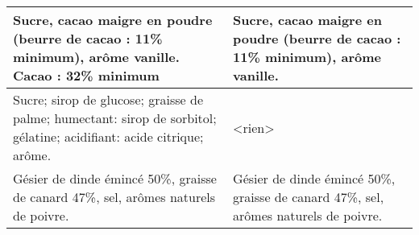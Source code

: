 \begin{longtable}{p{7cm}p{7cm}}
                                                                                                                                                                                                     Sucre, cacao maigre en poudre (beurre de cacao : 11\% minimum), arôme vanille. \newline Cacao : 32\% minimum &                                                                                                                                                                                                                                                                                                                                                                                          Sucre, cacao maigre en poudre (beurre de cacao : 11\% minimum), arôme vanille.  \\ \hline
                                                                                                                                                                                  Sucre; sirop de glucose; graisse de palme; humectant: sirop de sorbitol; gélatine; acidifiant: acide citrique; arôme. &                                                                                                                                                                                                                                                                                                                                                                                                                                                                  <rien> \\ \hline
                                                                                                                                                                                                                     Gésier de dinde émincé 50\%, graisse de canard 47\%, sel, arômes naturels de poivre. &                                                                                                                                                                                                                                                                                                                                                                                 Gésier de dinde émincé 50\%,  graisse de canard 47\%, sel, arômes naturels de poivre.  \newline   \\ \hline

\end{longtable}
